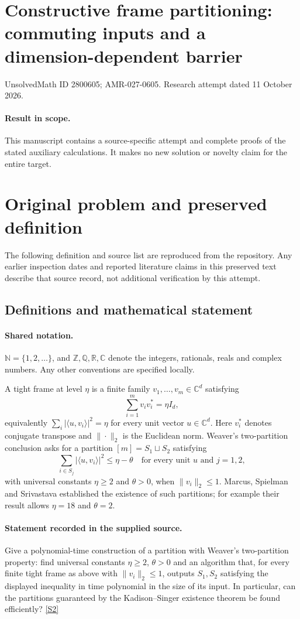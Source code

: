 \documentclass[11pt]{article}
\begin{document}
\section*{Constructive frame partitioning: commuting inputs and a dimension-dependent barrier}
\noindent UnsolvedMath ID 2800605; AMR-027-0605. Research attempt dated 11 October 2026.
\paragraph{Result in scope.}This manuscript contains a source-specific attempt and complete proofs of the stated auxiliary calculations. It makes no new solution or novelty claim for the entire target.
\section{Original problem and preserved definition}
The following definition and source list are reproduced from the repository. Any earlier inspection dates and reported literature claims in this preserved text describe that source record, not additional verification by this attempt.
\subsection{Definitions and mathematical statement}

\paragraph{Shared notation.}$\mathbb N=\{1,2,\ldots\}$, and $\mathbb Z,\mathbb Q,\mathbb R,\mathbb C$ denote the integers, rationals, reals and complex numbers. Any other conventions are specified locally.


A tight frame at level \(\eta\) is a finite family \(v_1,\ldots,v_m\in\mathbb C^d\) satisfying
\[\sum_{i=1}^m v_i v_i^*=\eta I_d,\]
equivalently \(\sum_i|\langle u,v_i\rangle|^2=\eta\) for every unit vector \(u\in\mathbb C^d\). Here \(v_i^*\) denotes conjugate transpose and \(\|\cdot\|_2\) is the Euclidean norm. Weaver's two-partition conclusion asks for a partition \([m]=S_1\sqcup S_2\) satisfying
\[\sum_{i\in S_j}|\langle u,v_i\rangle|^2\le\eta-\theta
\quad\text{for every unit }u\text{ and }j=1,2,\]
with universal constants \(\eta\ge2\) and \(\theta>0\), when \(\|v_i\|_2\le1\). Marcus, Spielman and Srivastava established the existence of such partitions; for example their result allows \(\eta=18\) and \(\theta=2\).
\paragraph{Statement recorded in the supplied source.}
Give a polynomial-time construction of a partition with Weaver's two-partition property: find universal constants \(\eta\ge2\), \(\theta>0\) and an algorithm that, for every finite tight frame as above with \(\|v_i\|_2\le1\), outputs \(S_1,S_2\) satisfying the displayed inequality in time polynomial in the size of its input. In particular, can the partitions guaranteed by the Kadison--Singer existence theorem be found efficiently? \href{https://arxiv.org/pdf/2205.02161}{[S2]}
\end{document}
